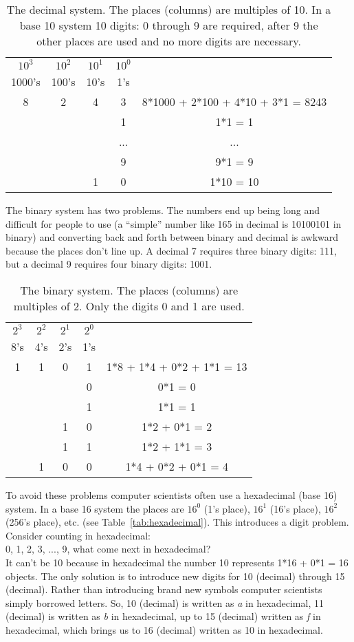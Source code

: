 \documentclass[11pt]{article} %
\begin{document}
\begin{table}
\centering
\begin{tabular}{c | c | c | c || c  }
$10^{3}$ & $10^{2}$ &$10^1$&$10^0$&\\
 1000's &  100's & 10's & 1's & \\
\hline
8 &   2 & 4 & 3 & 8*1000 + 2*100 + 4*10 + 3*1 = 8243 \\
&& & 1 & 1*1 = 1\\
&& & ... & ...\\
&& & 9 & 9*1 = 9 \\
&& 1 & 0 & 1*10 = 10\\
\end{tabular}
\caption{The decimal system.  The places (columns) are multiples of 10.  In a base 10 system 10 digits: 0 through 9 are required, after 9 the other places are used and no more digits are necessary.}\label{tab:decimal}
\end{table}

The binary system has two problems.  The numbers end up being long and difficult for people to use (a ``simple'' number like 165 in decimal is 10100101 in binary) and converting back and forth between binary and decimal is awkward because the places don't line up.  A decimal 7 requires three binary digits: 111, but a decimal 9 requires four binary digits: 1001.

\begin{table}
\centering
\begin{tabular}{ c|c | c | c || c  }
$2^{3}$ & $2^{2}$ &$2^1$&$2^0$&\\
 8's &  4's & 2's & 1's & \\
\hline
 1 &  1 & 0 & 1 & 1*8 + 1*4 + 0*2 + 1*1 = 13 \\
&& & 0 & 0*1 = 0\\
&& & 1 & 1*1 = 1 \\
&& 1& 0 & 1*2 + 0*1 = 2 \\
&& 1 & 1 & 1*2 + 1*1 = 3\\
& 1 & 0 & 0 & 1*4 + 0*2 + 0*1 = 4\\
\end{tabular}
\caption{The binary system.  The places (columns) are multiples of 2.  Only the digits 0 and 1 are used.}\label{tab:binary}
\end{table}

To avoid these problems computer scientists often use a hexadecimal (base 16) system.  In a base 16 system the places are $16^{0}$ (1's place), $16^{1}$ (16's place), $16^{2}$ (256's place), etc. (see Table~\ref{tab:hexadecimal}).  This introduces a digit problem.  Consider counting in hexadecimal: \\
0, 1, 2, 3, ..., 9, what come next in hexadecimal?  \\
It can't be 10 because in hexadecimal the number 10 represents 1*16 + 0*1 = 16 objects.  The only solution is to introduce new digits for 10 (decimal) through 15 (decimal).  Rather than introducing brand new symbols computer scientists simply borrowed letters.  So, 10 (decimal) is written as \emph{a} in hexadecimal, 11 (decimal) is written as \emph{b} in hexadecimal, up to 15 (decimal) written as \emph{f} in hexadecimal, which brings us to 16 (decimal) written as 10 in hexadecimal.
\end{document}
